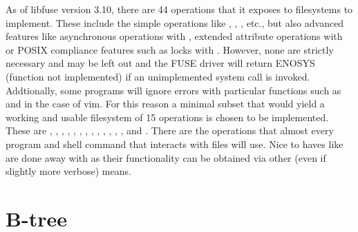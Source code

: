         As of libfuse version 3.10, there are 44 operations that it exposes to
        filesystems to implement. These include the simple operations like
        , , , etc., but also
        advanced features like asynchronous operations with ,
        extended attribute operations with  or POSIX
        compliance features such as locks with . However, none
        are strictly necessary and may be left out and the FUSE driver will
        return ENOSYS (function not implemented) if an unimplemented system
        call is invoked. Addtionally, some programs will ignore errors with
        particular functions such as  and  in
        the case of vim. For this reason a minimal subset that would yield a
        working and usable filesystem of 15 operations is chosen to be
        implemented. These are , ,
        , , ,
        , , , ,
        , , , ,
         and . There are the operations that
        almost every program and shell command that interacts with files will
        use. Nice to haves like  are done away with as their
        functionality can be obtained via other (even if slightly more verbose)
        means.




    \section{B-tree}
        \label{sec_implementation_btree}


